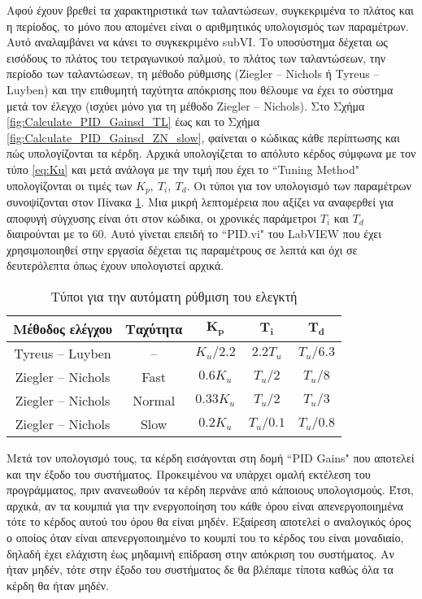 Αφού έχουν βρεθεί τα χαρακτηριστικά των ταλαντώσεων, συγκεκριμένα το πλάτος και η περίοδος, το μόνο που απομένει είναι ο αριθμητικός υπολογισμός των παραμέτρων. Αυτό αναλαμβάνει να κάνει το συγκεκριμένο subVI. Το υποσύστημα δέχεται ως εισόδους το πλάτος του τετραγωνικού παλμού, το πλάτος των ταλαντώσεων, την περίοδο των ταλαντώσεων, τη μέθοδο ρύθμισης (Ziegler -- Nichols ή Tyreus -- Luyben) και την επιθυμητή ταχύτητα απόκρισης που θέλουμε να έχει το σύστημα μετά τον έλεγχο (ισχύει μόνο για τη μέθοδο Ziegler -- Nichols). Στο Σχήμα \ref{fig:Calculate_PID_Gainsd_TL} έως και το Σχήμα \ref{fig:Calculate_PID_Gainsd_ZN_slow}, φαίνεται ο κώδικας κάθε περίπτωσης και πώς υπολογίζονται τα κέρδη. Αρχικά υπολογίζεται το απόλυτο κέρδος σύμφωνα με τον τύπο \ref{eq:Ku} και μετά ανάλογα με την τιμή που έχει το ``Tuning Method" υπολογίζονται οι τιμές των $K_p,\ T_i,\ T_d$. Οι τύποι για τον υπολογισμό των παραμέτρων συνοψίζονται στον Πίνακα \ref{table:autotuning_parameters}. Μια μικρή λεπτομέρεια που αξίζει να αναφερθεί για αποφυγή σύγχυσης είναι ότι στον κώδικα, οι χρονικές παράμετροι $T_i$ και $T_d$ διαιρούνται με το $60$. Αυτό γίνεται επειδή το ``PID.vi" του LabVIEW που έχει χρησιμοποιηθεί στην εργασία δέχεται τις παραμέτρους σε λεπτά και όχι σε δευτερόλεπτα όπως έχουν υπολογιστεί αρχικά. 

\begin{table}[h]
\begin{center}
	\begin{tabular}{|c|c|c|c|c|}
	\hline 
	\textbf{Μέθοδος ελέγχου} & \textbf{Ταχύτητα} & $\mathbf{K_p}$ & $\mathbf{T_i}$ & $\mathbf{T_d}$ \\ 
	\hline 
	Tyreus -- Luyben & -- & $K_u/2.2$ & $2.2T_u$ & $T_u/6.3$ \\ 
	\hline
	Ziegler -- Nichols & Fast & $0.6K_u$ & $T_u/2$ & $T_u/8$ \\
	\hline
	Ziegler -- Nichols & Normal & $0.33K_u$ & $T_u/2$ & $T_u/3$ \\
	\hline
	Ziegler -- Nichols & Slow & $0.2K_u$ & $T_u/0.1$ & $T_u/0.8$ \\
	\hline
	\end{tabular} 
\caption{Τύποι για την αυτόματη ρύθμιση του ελεγκτή}
\label{table:autotuning_parameters}
\end{center}
\end{table}

Μετά τον υπολογισμό τους, τα κέρδη εισάγονται στη δομή ``PID Gains" που αποτελεί και την έξοδο του συστήματος. Προκειμένου να υπάρχει ομαλή εκτέλεση του προγράμματος, πριν ανανεωθούν τα κέρδη περνάνε από κάποιους υπολογισμούς. Έτσι, αρχικά, αν τα κουμπιά για την ενεργοποίηση του κάθε όρου είναι απενεργοποιημένα τότε το κέρδος αυτού του όρου θα είναι μηδέν. Εξαίρεση αποτελεί ο αναλογικός όρος ο οποίος όταν είναι απενεργοποιημένο το κουμπί του το κέρδος του είναι μοναδιαίο, δηλαδή έχει ελάχιστη έως μηδαμινή επίδραση στην απόκριση του συστήματος. Αν ήταν μηδέν, τότε στην έξοδο του συστήματος δε θα βλέπαμε τίποτα καθώς όλα τα κέρδη θα ήταν μηδέν.

